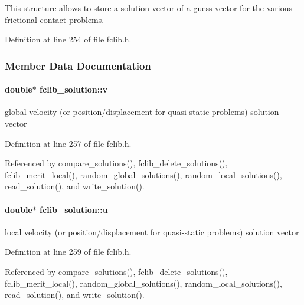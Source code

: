 This structure allows to store a solution vector of a guess vector for the various frictional contact problems. 

Definition at line 254 of file fclib.\+h.



\subsubsection{Member Data Documentation}
\hypertarget{structfclib__solution_a252982ce524686a094223a55c194fea8}{}
\paragraph[{v}]{\setlength{\rightskip}{0pt plus 5cm}double$\ast$ fclib\+\_\+solution\+::v}\label{structfclib__solution_a252982ce524686a094223a55c194fea8}


global velocity (or position/displacement for quasi-\/static problems) solution vector 



Definition at line 257 of file fclib.\+h.



Referenced by compare\+\_\+solutions(), fclib\+\_\+delete\+\_\+solutions(), fclib\+\_\+merit\+\_\+local(), random\+\_\+global\+\_\+solutions(), random\+\_\+local\+\_\+solutions(), read\+\_\+solution(), and write\+\_\+solution().

\hypertarget{structfclib__solution_acb160f0dad04b9420388464d256ae41f}{}
\paragraph[{u}]{\setlength{\rightskip}{0pt plus 5cm}double$\ast$ fclib\+\_\+solution\+::u}\label{structfclib__solution_acb160f0dad04b9420388464d256ae41f}


local velocity (or position/displacement for quasi-\/static problems) solution vector 



Definition at line 259 of file fclib.\+h.



Referenced by compare\+\_\+solutions(), fclib\+\_\+delete\+\_\+solutions(), fclib\+\_\+merit\+\_\+local(), random\+\_\+global\+\_\+solutions(), random\+\_\+local\+\_\+solutions(), read\+\_\+solution(), and write\+\_\+solution().

